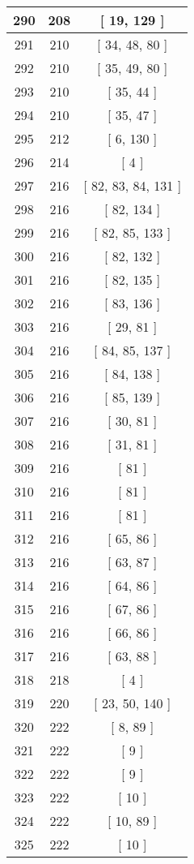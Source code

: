 \begin{center}
\begin{longtable}[H]{|| c c c ||}
\hline
290 & 208 & [ 19, 129 ] \\ 
\hline
291 & 210 & [ 34, 48, 80 ] \\ 
\hline
292 & 210 & [ 35, 49, 80 ] \\ 
\hline
293 & 210 & [ 35, 44 ] \\ 
\hline
294 & 210 & [ 35, 47 ] \\ 
\hline
295 & 212 & [ 6, 130 ] \\ 
\hline
296 & 214 & [ 4 ] \\ 
\hline
297 & 216 & [ 82, 83, 84, 131 ] \\ 
\hline
298 & 216 & [ 82, 134 ] \\ 
\hline
299 & 216 & [ 82, 85, 133 ] \\ 
\hline
300 & 216 & [ 82, 132 ] \\ 
\hline
301 & 216 & [ 82, 135 ] \\ 
\hline
302 & 216 & [ 83, 136 ] \\ 
\hline
303 & 216 & [ 29, 81 ] \\ 
\hline
304 & 216 & [ 84, 85, 137 ] \\ 
\hline
305 & 216 & [ 84, 138 ] \\ 
\hline
306 & 216 & [ 85, 139 ] \\ 
\hline
307 & 216 & [ 30, 81 ] \\ 
\hline
308 & 216 & [ 31, 81 ] \\ 
\hline
309 & 216 & [ 81 ] \\ 
\hline
310 & 216 & [ 81 ] \\ 
\hline
311 & 216 & [ 81 ] \\ 
\hline
312 & 216 & [ 65, 86 ] \\ 
\hline
313 & 216 & [ 63, 87 ] \\ 
\hline
314 & 216 & [ 64, 86 ] \\ 
\hline
315 & 216 & [ 67, 86 ] \\ 
\hline
316 & 216 & [ 66, 86 ] \\ 
\hline
317 & 216 & [ 63, 88 ] \\ 
\hline
318 & 218 & [ 4 ] \\ 
\hline
319 & 220 & [ 23, 50, 140 ] \\ 
\hline
320 & 222 & [ 8, 89 ] \\ 
\hline
321 & 222 & [ 9 ] \\ 
\hline
322 & 222 & [ 9 ] \\ 
\hline
323 & 222 & [ 10 ] \\ 
\hline
324 & 222 & [ 10, 89 ] \\ 
\hline
325 & 222 & [ 10 ] \\ 

\end{longtable}
\end{center}
